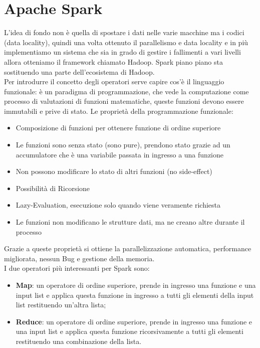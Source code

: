 \documentclass[11pt, twocolumn]{article}
\newenvironment{myitemize}
{ \begin{itemize}[topsep=0ex]
		\setlength{\itemsep}{0pt}
		\setlength{\parskip}{0pt}
		\setlength{\parsep}{0pt}     }
	{ \end{itemize}                  }
\begin{document}
\section{Apache Spark}
L'idea di fondo non è quella di spostare i dati nelle varie macchine ma i codici (data locality), quindi una volta ottenuto il parallelismo e data locality e in più implementiamo un sistema che sia in grado di gestire i fallimenti a vari livelli allora otteniamo il framework chiamato Hadoop.
Spark piano piano sta sostituendo una parte dell'ecosistema di Hadoop.\\
Per introdurre il concetto degli operatori serve capire cos'è il linguaggio funzionale: è un paradigma di programmazione, che vede la computazione come processo di valutazioni di funzioni matematiche, queste funzioni devono essere immutabili e prive di stato. 
Le proprietà della programmazione funzionale:
\begin{myitemize}
	\item Composizione di funzioni per ottenere funzione di ordine superiore
	\item Le funzioni sono senza stato (sono pure), prendono stato grazie ad un accumulatore che è una variabile passata in ingresso a una funzione
	\item Non possono modificare lo stato di altri funzioni (no side-effect)
	\item Possibilità di Ricorsione
	\item Lazy-Evaluation, esecuzione solo quando viene veramente richiesta
	\item Le funzioni non modificano le strutture dati, ma ne creano altre durante il processo
\end{myitemize}
Grazie a queste proprietà si ottiene la parallelizzazione automatica, performance migliorata, nessun Bug e gestione della memoria.\\
I due operatori più interessanti per Spark sono:
\begin{myitemize}
	\item \textbf{Map}: un operatore di ordine superiore, prende in ingresso una funzione e una input list e applica questa funzione in ingresso a tutti gli elementi della input list restituendo un'altra lista;
	\item \textbf{Reduce}: un operatore di ordine superiore, prende in ingresso una funzione e una input list e applica questa funzione ricorsivamente a tutti gli elementi restituendo una combinazione della lista.
\end{myitemize}
\end{document}
